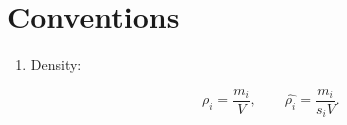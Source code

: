 \documentclass[a4paper,12pt]{article}
\begin{document}
\section{Conventions}

\begin{enumerate}

    \item Density:

        \[
            \rho_i = \frac{m_i}{V}, \qquad
            \hat{\rho_i} = \frac{m_i}{s_i V}
        .\] 

\end{enumerate}
\end{document}
